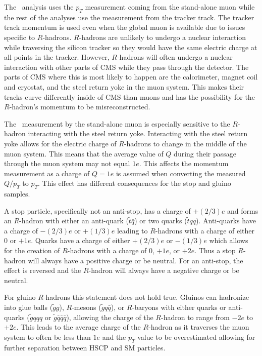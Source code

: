 The \muononly\ analysis uses the $p_T$ measurement coming from the stand-alone muon while the rest of the analyses use the measurement from the tracker track.
The tracker track momentum is used even when the global muon is available due to issues specific to $R$-hadrons.
$R$-hadrons are unlikely to undergo a nuclear interaction while traversing the silicon tracker so they would have the same electric charge at all points in the tracker.
However, $R$-hadrons will often undergo a nuclear interaction with other parts of CMS while they pass through the detector. 
The parts of CMS
where this is most likely to happen are the calorimeter, magnet coil  and cryostat, and the steel return yoke in the muon system.
This makes their tracks curve differently inside of CMS than muons and has the possibility for the $R$-hadron's momentum to be misreconstructed.

The \pt\ measurement by the stand-alone muon is especially sensitive to the $R$-hadron interacting with the steel return yoke.
Interacting with the steel return yoke allows for the electric charge of $R$-hadrons to change in the middle of the muon system.
This means that the average value of $Q$ during their passage through the muon system may not equal $1e$.
This affects the momentum measurement as a charge of $Q=1e$ is assumed when converting the measured $Q/p_T$ to $p_T$.
This effect has different consequences for the stop and gluino samples.

A stop particle, specifically not an anti-stop, has a charge of $+(2/3)e$ and forms an $R$-hadron with either an anti-quark ($\tilde{t} \bar{q}$) or
two quarks  ($\tilde{t} q q$). Anti-quarks have a charge of $-(2/3)e$ or $+(1/3)e$ leading to $R$-hadrons with a charge
of either 0 or $+1e$. Quarks have a charge of either $+(2/3)e$ or $-(1/3)e$ which allows for
the creation of $R$-hadrons with a charge of 0, $+1e$, or $+2e$. Thus a stop $R$-hadron will always have a
positive charge or be neutral. For an anti-stop, the effect is reversed and the $R$-hadron will always have a
negative charge or be neutral.

For gluino $R$-hadrons this statement does not hold true. Gluinos can hadronize into glue balls ($\tilde{g}g$), $R$-mesons ($\tilde{g} q \bar{q}$), or
$R$-baryons  with either quarks or anti-quarks ($\tilde{g} qqq$ or $\tilde{g} \bar{q}\bar{q}\bar{q}$),
allowing the charge of the $R$-hadron to range from $-2e$ to $+2e$. This leads to the
average charge of the $R$-hadron as it traverses the muon system to often be less than $1e$ and the $p_T$ value to be overestimated allowing for further separation
between HSCP and SM particles.

